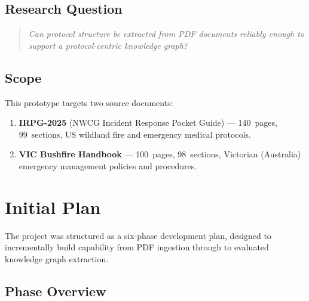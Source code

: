 \documentclass[12pt,a4paper]{article}
\begin{document}
\subsection{Research Question}

\begin{quote}
\emph{Can protocol structure be extracted from PDF documents reliably enough to support a protocol-centric knowledge graph?}
\end{quote}

\subsection{Scope}

This prototype targets two source documents:
\begin{enumerate}[leftmargin=2em]
    \item \textbf{IRPG-2025} (NWCG Incident Response Pocket Guide) --- 140~pages, 99~sections, US wildland fire and emergency medical protocols.
    \item \textbf{VIC Bushfire Handbook} --- 100~pages, 98~sections, Victorian (Australia) emergency management policies and procedures.
\end{enumerate}

\section{Initial Plan}
\label{sec:initial-plan}

The project was structured as a six-phase development plan, designed to incrementally build capability from PDF ingestion through to evaluated knowledge graph extraction.

\subsection{Phase Overview}
\end{document}
